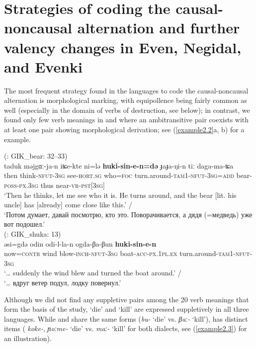 \documentclass[output=paper,colorlinks,citecolor=brown]{langscibook}
\begin{document}
\section{Strategies of coding the causal-noncausal alternation and further valency changes in Even, Negidal, and Evenki}\label{section2.3}

The most frequent strategy found in the  languages to code the causal-noncausal alternation is morphological marking, with equipollence being fairly common as well (especially in the domain of verbs of destruction, see below); in contrast, we found only few verb meanings in  and  where an ambitransitive pair coexists with at least one pair showing morphological derivation; see (\ref{example2.2}a, b) for a  example.

\ea
    \label{example2.2}
    \ea
     (\citealt{Pakendorf2017}: GIK\_bear: 32--33)\\
    \gll taduk	məjgɑː-ja-n	iʨe-kte	ni=lə   \textbf{huki-sin-e-n=də}	ɟaɟa-ŋi-n	tiː	daga-ma-ʨa\\
    then	think-\textsc{nfut-3sg}	see-\textsc{hort.sg}	who=\textsc{foc} turn.around-\textsc{tam1-nfut-3sg=add}	bear-\textsc{poss-px.3sg}	thus	near-\textsc{vr-pst[3sg]}\\
    \glt ‘Then he thinks, let me see who it is. He turns around, and the bear [lit. his uncle] has [already] come close like this.’ /\\‘Потом думает, давай посмотрю, кто это. Поворачивается, а дядя (=медведь) уже вот подошел.’\\

\ex
     (\citealt{Pakendorf2017}: GIK\_shuka: 13)\\
    \gll əsi=gdə	odin	odi-l-la-n	ogda-βa-βun	\textbf{huki-sin-e-n}\\
    now=\textsc{contr}	wind	blow-\textsc{inch-nfut-3sg}	boat-\textsc{acc-px.1pl.ex}	turn.around-\textsc{tam1-nfut-3sg}\\
    \glt ‘… suddenly the wind blew and turned the boat around.’ /\\‘… вдруг ветер подул, лодку повернул.’\\
    \z
\z

Although we did not find any suppletive pairs among the 20 verb meanings that form the basis of the study, ‘die’ and ‘kill’ are expressed suppletively in all three languages. While  and  share the same forms (\textit{bu-} ‘die’ vs. \textit{βaː-} ‘kill’),  has distinct items  ( \textit{koke-},  \textit{ɲoːme-} ‘die’ vs. \textit{maː-} ‘kill’ for both dialects, see (\ref{example2.3}) for an illustration).\pagebreak
\end{document}
